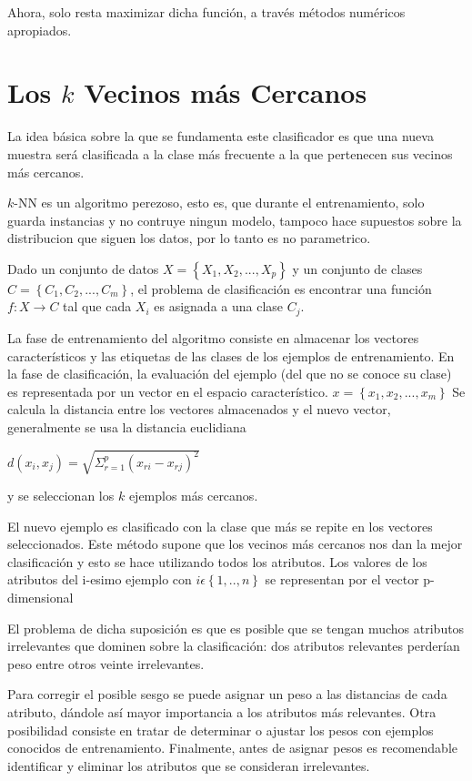 \documentclass[11pt,letterpaper,reqno]{article}
\begin{document}
Ahora, solo resta maximizar dicha función, a través métodos numéricos apropiados. 

\section{Los $k$ Vecinos más Cercanos}

La idea básica sobre la que se fundamenta este clasificador es que una nueva muestra será clasificada a la clase más frecuente a la que pertenecen sus vecinos más cercanos.

$k$-NN es un algoritmo perezoso, esto es, que durante el entrenamiento, solo guarda instancias y no contruye ningun modelo, tampoco hace supuestos sobre la distribucion que siguen los datos, por lo tanto es no parametrico.

Dado un conjunto de datos $ X= \left\lbrace X_1,X_2, ... , X_p \right\rbrace $ y un conjunto de clases $ C= \left\lbrace C_1,C_2, ... , C_m \right\rbrace $, el  problema de clasificación es encontrar una función $ f:X \longrightarrow C $ tal que cada $ X_i $ es asignada a una clase $ C_j $.

La fase de entrenamiento del algoritmo consiste en almacenar los vectores característicos y las etiquetas de las clases de los ejemplos de entrenamiento.  En la fase de clasificación, la evaluación del ejemplo (del que no se conoce su clase) es representada por un vector en el espacio característico.
$ x = \left\lbrace x_1,x_2, ... , x_m \right\rbrace $
Se calcula la distancia entre los vectores almacenados y el nuevo vector, generalmente se usa la distancia euclidiana

\begin{center}
$ d(x_i,x_j)=\sqrt{\Sigma_{r=1}^{p} (x_{ri}-x_{rj})^2} $
\end{center}
y se seleccionan los $ k $ ejemplos más cercanos.

El nuevo ejemplo es clasificado con la clase que más se repite en los vectores seleccionados. Este método supone que los vecinos más cercanos nos dan la mejor clasificación y esto se hace utilizando todos los atributos. Los valores de los atributos del i-esimo ejemplo con $ i \epsilon \left\lbrace 1, .. , n \right\rbrace $ se representan por el vector p-dimensional

El problema de dicha suposición es que es posible que se tengan muchos atributos irrelevantes que dominen sobre la clasificación: dos atributos relevantes perderían peso entre otros veinte irrelevantes.

Para corregir el posible sesgo se puede asignar un peso a las distancias de cada atributo, dándole así mayor importancia a los atributos más relevantes. Otra posibilidad consiste en tratar de determinar o ajustar los pesos con ejemplos conocidos de entrenamiento. Finalmente, antes de asignar pesos es recomendable identificar y eliminar los atributos que se consideran irrelevantes.
\end{document}
